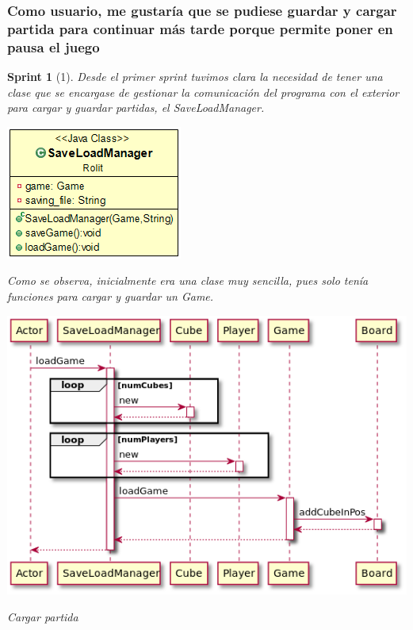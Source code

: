 \documentclass{article}
\theoremstyle{break}
\newtheorem*{sprint}{Sprint}
\begin{document}
\subsubsection{Como usuario, me gustaría que se pudiese guardar y cargar partida para continuar más tarde porque permite poner en pausa el juego}
\begin{sprint}[1]
Desde el primer sprint tuvimos clara la necesidad de tener una clase que se encargase de gestionar la comunicación del programa con el exterior para cargar y guardar partidas, el \textit{SaveLoadManager}.

\begin{center}
\centering
\includegraphics[scale=0.5]{save-load-manager-sprint1.png}
\end{center}

Como se observa, inicialmente era una clase muy sencilla, pues solo tenía funciones para cargar y guardar un \textit{Game}.

\begin{center}
\centering
\includegraphics[scale=0.5]{load-sprint1.png}

Cargar partida
\end{center}


\end{sprint}
\end{document}
